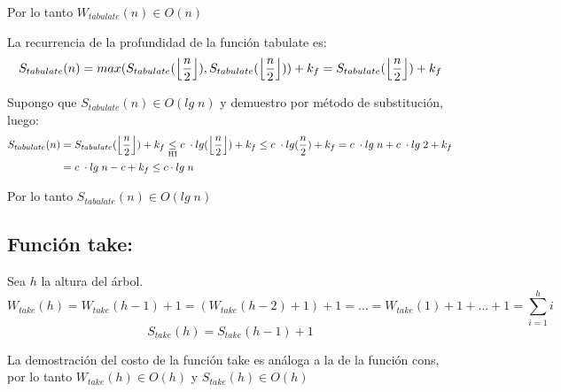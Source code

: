 \documentclass[11pt]{article}
\DeclarePairedDelimiter\floor{\lfloor}{\rfloor}
\begin{document}
Por lo tanto $ W_{tabulate}(n) \in O(n) $

La recurrencia de la profundidad de la función tabulate es:
\begin{equation*}
  S_{tabulate}(n) = max(S_{tabulate}(\floor*{\frac{n}{2}}),
  S_{tabulate}(\floor*{\frac{n}{2}})) + k_f  = S_{tabulate}(\floor*{\frac{n}{2}})
  + k_f
\end{equation*}

\noindent Supongo que $ S_{tabulate}(n) \in O(lg \; n) $ y demuestro por método
de substitución, luego:
\begin{align*}
  S_{tabulate}(n) &= S_{tabulate}(\floor*{\frac{n}{2}}) + k_f 
  \underset{\text{HI}}{\leq} c \; \cdot lg(\floor*{\frac{n}{2}}) + k_f
  \leq c \; \cdot lg(\frac{n}{2}) + k_f = c \; \cdot lg \; n +
  c \; \cdot lg \; 2 + k_f \\
  & = c \; \cdot lg \; n - c + k_f \leq c \cdot lg \; n
\end{align*}

Por lo tanto $ S_{tabulate}(n) \in O(lg \; n) $


\subsection*{Función take:}
Sea $h$ la altura del árbol.
\begin{equation*}
  W_{take}(h) = W_{take}(h - 1) + 1 = (W_{take}(h - 2) + 1) + 1 = ... =
  W_{take}(1) + 1 + ... + 1 = \sum_{i=1}^{h} i 
\end{equation*}
\begin{equation*}
  S_{take}(h) = S_{take}(h - 1) + 1
\end{equation*}

La demostración del costo de la función take es análoga a la de la función cons,
por lo tanto $ W_{take}(h) \in O(h) $ y $ S_{take}(h) \in O(h) $
\end{document}
